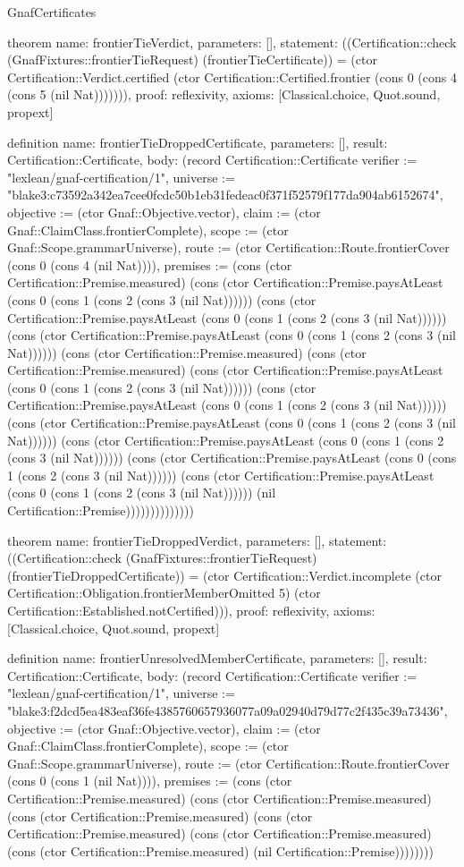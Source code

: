 \begin{lexlean}{GnafCertificates}
\begin{semanticmodule}
theorem{
  name: frontierTieVerdict,
  parameters: [],
  statement: ((Certification::check (GnafFixtures::frontierTieRequest) (frontierTieCertificate)) = (ctor Certification::Verdict.certified (ctor Certification::Certified.frontier (cons 0 (cons 4 (cons 5 (nil Nat))))))),
  proof: reflexivity{},
  axioms: [Classical.choice, Quot.sound, propext]
}

definition{
  name: frontierTieDroppedCertificate,
  parameters: [],
  result: Certification::Certificate,
  body: (record Certification::Certificate {verifier := "lexlean/gnaf-certification/1", universe := "blake3:c73592a342ea7cee0fcdc50b1eb31fedeac0f371f52579f177da904ab6152674", objective := (ctor Gnaf::Objective.vector), claim := (ctor Gnaf::ClaimClass.frontierComplete), scope := (ctor Gnaf::Scope.grammarUniverse), route := (ctor Certification::Route.frontierCover (cons 0 (cons 4 (nil Nat)))), premises := (cons (ctor Certification::Premise.measured) (cons (ctor Certification::Premise.paysAtLeast (cons 0 (cons 1 (cons 2 (cons 3 (nil Nat)))))) (cons (ctor Certification::Premise.paysAtLeast (cons 0 (cons 1 (cons 2 (cons 3 (nil Nat)))))) (cons (ctor Certification::Premise.paysAtLeast (cons 0 (cons 1 (cons 2 (cons 3 (nil Nat)))))) (cons (ctor Certification::Premise.measured) (cons (ctor Certification::Premise.measured) (cons (ctor Certification::Premise.paysAtLeast (cons 0 (cons 1 (cons 2 (cons 3 (nil Nat)))))) (cons (ctor Certification::Premise.paysAtLeast (cons 0 (cons 1 (cons 2 (cons 3 (nil Nat)))))) (cons (ctor Certification::Premise.paysAtLeast (cons 0 (cons 1 (cons 2 (cons 3 (nil Nat)))))) (cons (ctor Certification::Premise.paysAtLeast (cons 0 (cons 1 (cons 2 (cons 3 (nil Nat)))))) (cons (ctor Certification::Premise.paysAtLeast (cons 0 (cons 1 (cons 2 (cons 3 (nil Nat)))))) (cons (ctor Certification::Premise.paysAtLeast (cons 0 (cons 1 (cons 2 (cons 3 (nil Nat)))))) (nil Certification::Premise)))))))))))))})
}

theorem{
  name: frontierTieDroppedVerdict,
  parameters: [],
  statement: ((Certification::check (GnafFixtures::frontierTieRequest) (frontierTieDroppedCertificate)) = (ctor Certification::Verdict.incomplete (ctor Certification::Obligation.frontierMemberOmitted 5) (ctor Certification::Established.notCertified))),
  proof: reflexivity{},
  axioms: [Classical.choice, Quot.sound, propext]
}

definition{
  name: frontierUnresolvedMemberCertificate,
  parameters: [],
  result: Certification::Certificate,
  body: (record Certification::Certificate {verifier := "lexlean/gnaf-certification/1", universe := "blake3:f2dcd5ea483eaf36fe4385760657936077a09a02940d79d77c2f435c39a73436", objective := (ctor Gnaf::Objective.vector), claim := (ctor Gnaf::ClaimClass.frontierComplete), scope := (ctor Gnaf::Scope.grammarUniverse), route := (ctor Certification::Route.frontierCover (cons 0 (cons 1 (nil Nat)))), premises := (cons (ctor Certification::Premise.measured) (cons (ctor Certification::Premise.measured) (cons (ctor Certification::Premise.measured) (cons (ctor Certification::Premise.measured) (cons (ctor Certification::Premise.measured) (cons (ctor Certification::Premise.measured) (nil Certification::Premise)))))))})
}


\end{semanticmodule}
\end{lexlean}
